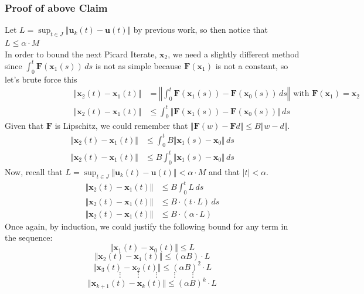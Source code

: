 \documentclass[12pt]{article}
\begin{document}
\subsubsection*{Proof of above Claim}
Let $L = \displaystyle \sup_{t \in J} \Vert \mathbf{u}_k(t) - \mathbf{u}(t) \Vert $ by previous work, so then notice that $L \leq \alpha \cdot M$ \\
In order to bound the next Picard Iterate, $\mathbf{x}_2$, we need a slightly different method since $\displaystyle \int_{0}^{t} \mathbf{F}(\mathbf{x}_1(s)) \, ds$ is not as simple because $\mathbf{F}(\mathbf{x}_1)$ is not a constant, so let's brute force this\\
\begin{align*}
 \hspace{8em} \Vert \mathbf{x}_2(t) - \mathbf{x}_1(t) \Vert &= \left\Vert \int_{0}^{t} \mathbf{F}(\mathbf{x}_1(s)) - \mathbf{F}(\mathbf{x}_0(s)) \, ds \right\Vert \text{ with } \mathbf{F}(\mathbf{x}_1) = \mathbf{x}_2 \\
 \hspace{8em} \Vert \mathbf{x}_2(t) - \mathbf{x}_1(t) \Vert &\leq  \int_{0}^{t} \Vert \mathbf{F}(\mathbf{x}_1(s)) - \mathbf{F}(\mathbf{x}_0(s)) \Vert \, ds 
\end{align*}
Given that $\mathbf{F}$ is Lipschitz, we could remember that $\Vert \mathbf{F}(w) - \mathbf{F}{d} \Vert \leq B \Vert w - d \Vert$. 
\begin{align*}
\Vert \mathbf{x}_2(t) - \mathbf{x}_1(t) \Vert &\leq  \int_{0}^{t} B \Vert \mathbf{x}_1(s) - \mathbf{x}_0 \Vert \, ds \\
\Vert \mathbf{x}_2(t) - \mathbf{x}_1(t) \Vert &\leq  B \int_{0}^{t}  \Vert \mathbf{x}_1(s) - \mathbf{x}_0 \Vert \, ds
\end{align*}
Now, recall that $L = \displaystyle \sup_{t \in J} \Vert \mathbf{u}_k(t) - \mathbf{u}(t) \Vert < \alpha \cdot M$ and that $|t|<\alpha$.
\begin{align*}
\Vert \mathbf{x}_2(t) - \mathbf{x}_1(t) \Vert &\leq  B \int_{0}^{t} L \, ds \\
\Vert \mathbf{x}_2(t) - \mathbf{x}_1(t) \Vert &\leq  B \cdot (t \cdot L) \, ds \\
\Vert \mathbf{x}_2(t) - \mathbf{x}_1(t) \Vert &\leq  B \cdot (\alpha \cdot L)
\end{align*}
Once again, by induction, we could justify the following bound for any term in the sequence:
\[ \Vert \mathbf{x}_{1}(t) - \mathbf{x}_{0}(t) \Vert \leq L\]
\[ \Vert \mathbf{x}_{2}(t) - \mathbf{x}_{1}(t) \Vert \leq (\alpha B) \cdot L\]
\[ \Vert \mathbf{x}_{3}(t) - \mathbf{x}_{2}(t) \Vert \leq (\alpha B)^2 \cdot L\]
\[\quad \vdots \quad \quad \vdots \quad \quad \vdots \quad \quad \vdots \quad \quad \vdots \]
\[ \Vert \mathbf{x}_{k+1}(t) - \mathbf{x}_k(t) \Vert \leq (\alpha B)^k \cdot L\]
\end{document}
